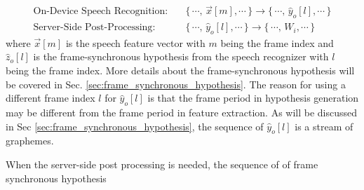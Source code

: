 \documentclass{article}
\begin{document}
\begin{subequations}
  \begin{align}
    \text{On-Device Speech Recognition}   : 
        & \quad \{ \, \cdots ,\, \vec{x}[m],     \cdots \, \} \rightarrow  
                \{ \, \cdots ,\, \hat{y}_o[l],   \cdots \, \} \\
    \text{Server-Side Post-Processing} : 
        & \quad \{ \, \cdots ,\, \hat{y}_o[l],   \cdots \, \}  \rightarrow
                \{ \, \cdots ,\, W_i,   \cdots \, \}
  \end{align}
\end{subequations}
where $\vec{x}[m]$ is the speech feature vector with $m$ being the 
frame index and $\hat{z}_o[l]$ is the frame-synchronous hypothesis 
from the speech recognizer with $l$ being the frame index. More details
about the frame-synchronous hypothesis will be covered in Sec. 
\ref{sec:frame_synchronous_hypothesis}. The reason for using a different
frame index $l$ for $\hat{y}_o[l]$ is that the frame period in hypothesis
generation may be different from the frame period in feature extraction.
As will be discussed in Sec \ref{sec:frame_synchronous_hypothesis}, 
the sequence of $\hat{y}_o[l]$ is a stream of graphemes. 

When the server-side post processing is needed, the sequence of  
of frame synchronous hypothesis 
\end{document}
